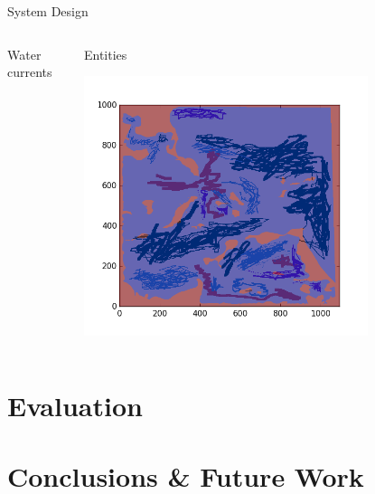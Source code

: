 \documentclass[9pt]{beamer}
\begin{document}
\begin{frame}{System Design}
\begin{columns}
\begin{column}{0.33\textwidth}
\begin{block}{Water currents}
\begin{center}
                 \end{center}
             \end{block} 
        \end{column}
         \begin{column}{0.33\textwidth}
             \begin{block}{Entities}   
                 \begin{center}
                     \includegraphics[width=0.75\textwidth,trim={2cm 2cm 1.75cm 1cm},clip]{img/Fig_entitiesMap.png}
                 \end{center}
             \end{block} 
        \end{column}
    \end{columns}


\end{frame}


\section{Evaluation}


\section{Conclusions \& Future Work}
\end{document}
